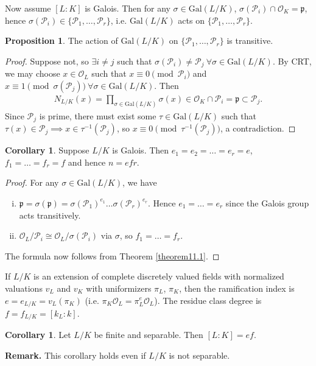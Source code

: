 \documentclass{article}
\theoremstyle{definition}
\newtheorem{cor}[theorem]{Corollary}
\newtheorem{prop}[theorem]{Proposition}
\begin{document}
Now assume $[L:K]$ is Galois. Then for any $\sigma \in \text{Gal}(L/K)$, $\sigma(\mathcal{P}_i) \cap \mathcal{O}_K =\mathfrak{p}$, hence $\sigma(\mathcal{P}_i) \in \{\mathcal{P}_1,\ldots,\mathcal{P}_r\}$, i.e. $\text{Gal}(L/K)$ acts on $\{\mathcal{P}_1,\ldots,\mathcal{P}_r\}$.
\begin{prop}\label{prop11.2}
    The action of $\text{Gal}(L/K)$ on $\{\mathcal{P}_1,\ldots,\mathcal{P}_r\}$ is transitive.
\end{prop}
\begin{proof}
    Suppose not, so $\exists i \neq j$ such that $\sigma(\mathcal{P}_i) \neq \mathcal{P}_j ~\forall \sigma \in \text{Gal}(L/K)$. By CRT, we may choose $x \in \mathcal{O}_L$ such that $x \equiv 0 \pmod{\mathcal{P}_i}$ and $x \equiv 1 \pmod{\sigma(\mathcal{P}_j)}~\forall \sigma \in \text{Gal}(L/K)$. Then 
    \begin{align*}
        N_{L/K}(x) = \prod_{\sigma \in \text{Gal}(L/K)}^{} \sigma(x) \in \mathcal{O}_K \cap\mathcal{P}_i = \mathfrak{p} \subset \mathcal{P}_j. 
    \end{align*}
    Since $\mathcal{P}_j$ is prime, there must exist some $\tau \in \text{Gal}(L/K)$ such that $\tau(x) \in \mathcal{P}_j \implies x \in \tau^{-1}(\mathcal{P}_j)$, so $x \equiv 0 \pmod{\tau^{-1}(\mathcal{P}_j)}$, a contradiction.
\end{proof}
\begin{cor}
    Suppose $L/K$ is Galois. Then $e_1 = e_2 = \ldots = e_r = e$, $f_1 = \ldots = f_r = f$ and hence $n = efr$.
\end{cor}
\begin{proof}
    For any $\sigma \in \text{Gal}(L/K)$, we have 
    \begin{enumerate}[(i)]
        \item $\mathfrak{p} = \sigma(\mathfrak{p}) = \sigma(\mathcal{P}_1)^{e_1}\ldots \sigma(\mathcal{P}_r)^{e_r}$. Hence $e_1 = \ldots = e_r$ since the Galois group acts transitively.
        \item $\mathcal{O}_L/\mathcal{P}_i \cong \mathcal{O}_L/\sigma(\mathcal{P}_i)$ via $\sigma$, so $f_1 = \ldots = f_r$.
    \end{enumerate}
    The formula now follows from Theorem \ref{theorem11.1}.
\end{proof}
If $L/K$ is an extension of complete discretely valued fields with normalized valuations $v_L$ and $v_K$ with uniformizers $\pi_L$, $\pi_K$, then the ramification index is $e = e_{L/K} = v_L(\pi_K)$ (i.e. $\pi_K \mathcal{O}_L = \pi_L^e \mathcal{O}_L$). The residue class degree is $f = f_{L/K} = [k_L:k]$.
\begin{cor}
    Let $L/K$ be finite and separable. Then $[L:K] = ef$.
\end{cor}
\textbf{Remark.} This corollary holds even if $L/K$ is not separable.
\end{document}
